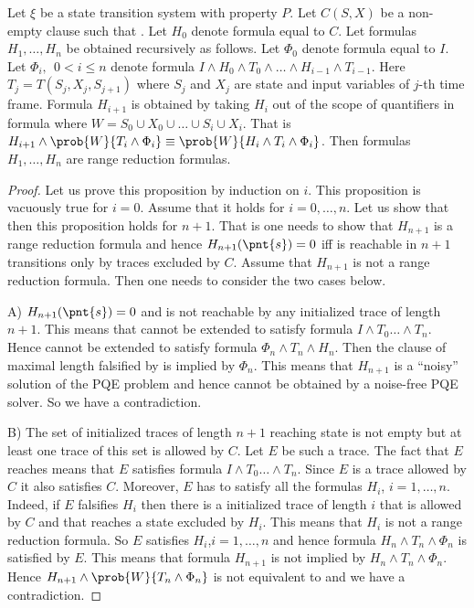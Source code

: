 \begin{proposition}
Let $\xi$ be a state transition system with property $P$. Let $C(S,X)$
be a non-empty clause such that .  Let $H_0$
denote formula equal to $C$. Let formulas $H_1,\dots,H_n$ be obtained
recursively as follows.  Let $\Phi_0$ denote formula equal to $I$.
Let $\Phi_i,~~0 < i \leq n$ denote formula $I \wedge H_0 \wedge
T_0 \wedge \dots \wedge H_{i-1} \wedge T_{i-1}$. Here $T_j =
T(S_j,X_j,S_{j+1})$ where $S_j$ and $X_j$ are state and input
variables of $j$-th time frame.  Formula $H_{i+1}$ is obtained by
taking $H_i$ out of the scope of quantifiers in
formula  where $W = S_0 \cup
X_0 \cup \dots \cup S_i \cup X_i$.  That is
$H_{i+1} \wedge \prob{W}{T_i \wedge \Phi_i} \equiv \prob{W}{H_i \wedge
T_i \wedge \Phi_i}$.  Then formulas $H_1,\dots,H_n$ are range
reduction formulas.
\end{proposition}
\begin{proof}
Let us prove this proposition by induction on $i$. This proposition is
vacuously true for $i=0$. Assume that it holds for $i=0,\dots,n$. Let
us show that then this proposition holds for $n+1$.  That is one needs
to show that $H_{n+1}$ is a range reduction formula and hence
$H_{n+1}(\pnt{s})=0$ iff  is reachable in $n+1$ transitions only
by traces excluded by $C$.  Assume that $H_{n+1}$ is not a range
reduction formula.  Then one needs to consider the two cases below.

A) $H_{n+1}(\pnt{s})=0$ and  is not reachable by any
initialized trace of length $n+1$. This means that  cannot be
extended to satisfy formula $I \wedge T_0 \dots \wedge T_n$.
Hence  cannot be extended to satisfy formula $\Phi_n \wedge
T_n \wedge H_n$. Then the clause of maximal length falsified
by  is implied by $\Phi_n$. This means that $H_{n+1}$ is a
``noisy'' solution of the PQE problem and hence cannot be obtained by
a noise-free PQE solver. So we have a contradiction.

B) The set of initialized traces of length $n+1$ reaching
state  is not empty but at least one trace of this set is
allowed by $C$. Let $E$ be such a trace. The fact that $E$
reaches  means that $E$ satisfies formula $I \wedge
T_0 \dots \wedge T_n$. Since $E$ is a trace allowed by $C$ it also
satisfies $C$. Moreover, $E$ has to satisfy all the formulas $H_i$,
$i=1,\dots,n$. Indeed, if $E$ falsifies $H_i$ then there is a
initialized trace of length $i$ that is allowed by $C$ and that
reaches a state excluded by $H_i$. This means that $H_i$ is not a
range reduction formula.  So $E$ satisfies $H_i$,$i=1,\dots,n$ and
hence formula $H_n \wedge T_n \wedge \Phi_n$ is satisfied by $E$. This
means that formula $H_{n+1}$ is not implied by $H_n \wedge
T_n \wedge \Phi_n$. Hence $H_{n+1} \wedge \prob{W}{T_n \wedge \Phi_n}$
is not equivalent to
 and we have a contradiction.
\end{proof}

